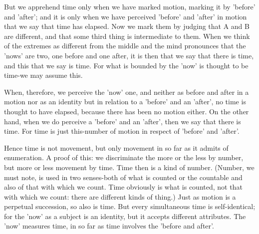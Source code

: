 But we apprehend time only when we have marked motion, marking it
by 'before' and 'after'; and it is only when we have perceived 'before'
and 'after' in motion that we say that time has elapsed. Now we mark
them by judging that A and B are different, and that some third thing
is intermediate to them. When we think of the extremes as different
from the middle and the mind pronounces that the 'nows' are two, one
before and one after, it is then that we say that there is time, and
this that we say is time. For what is bounded by the 'now' is thought
to be time-we may assume this. 

When, therefore, we perceive the 'now' one, and neither as before
and after in a motion nor as an identity but in relation to a 'before'
and an 'after', no time is thought to have elapsed, because there
has been no motion either. On the other hand, when we do perceive
a 'before' and an 'after', then we say that there is time. For time
is just this-number of motion in respect of 'before' and 'after'.

Hence time is not movement, but only movement in so far as it admits
of enumeration. A proof of this: we discriminate the more or the less
by number, but more or less movement by time. Time then is a kind
of number. (Number, we must note, is used in two senses-both of what
is counted or the countable and also of that with which we count.
Time obviously is what is counted, not that with which we count: there
are different kinds of thing.) Just as motion is a perpetual succession,
so also is time. But every simultaneous time is self-identical; for
the 'now' as a subject is an identity, but it accepts different attributes.
The 'now' measures time, in so far as time involves the 'before and
after'. 

